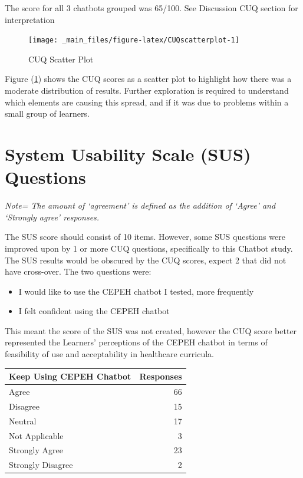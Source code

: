 \documentclass[a4paper, nobind]{templates/ociamthesis}
\begin{document}
The score for all 3 chatbots grouped was 65/100. See Discussion CUQ
section for interpretation

\begin{figure}

{\centering \texttt{[image: \_main\_files/figure-latex/CUQscatterplot-1]} 

}

\caption{CUQ Scatter Plot}\label{fig:CUQscatterplot}
\end{figure}

Figure (\ref{fig:CUQscatterplot}) shows the CUQ scores as a scatter plot to highlight how there was a moderate distribution of results.
Further exploration is required to understand which elements are causing this spread, and if it was due to problems within a small group of learners.

\hypertarget{system-usability-scale-sus-questions}{%
\section{System Usability Scale (SUS) Questions}\label{system-usability-scale-sus-questions}}

\emph{Note= The amount of `agreement' is defined as the addition of `Agree'
and `Strongly agree' responses.}

The SUS score should consist of 10 items. However, some SUS questions were improved upon by 1 or more CUQ questions, specifically to this Chatbot study. The SUS results would be obscured by the CUQ scores, expect 2 that did not have cross-over. The two questions were:

\begin{itemize}
\item
  I would like to use the CEPEH chatbot I tested, more frequently
\item
  I felt confident using the CEPEH chatbot
\end{itemize}

This meant the score of the SUS was not created, however the CUQ score better represented the Learners' perceptions of the CEPEH chatbot in terms of feasibility of use and acceptability in healthcare curricula.

\begin{longtable}[]{@{}lr@{}}
\toprule()
Keep Using CEPEH Chatbot & Responses \\
\midrule()
\endhead
Agree & 66 \\
Disagree & 15 \\
Neutral & 17 \\
Not Applicable & 3 \\
Strongly Agree & 23 \\
Strongly Disagree & 2 \\
\bottomrule()
\end{longtable}
\end{document}
